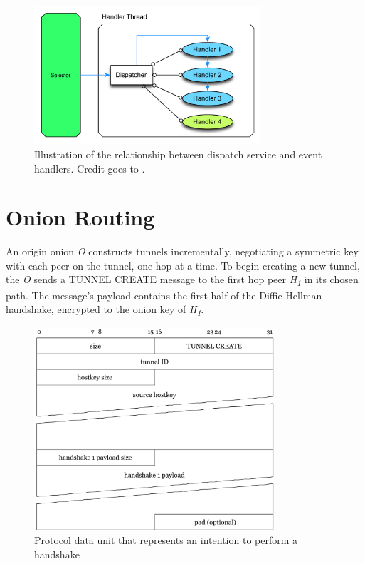 \documentclass{article}
\begin{document}
\begin{figure}[H]
\centering
     \includegraphics[width=0.75\textwidth]{arc_img2.png}
      \caption{Illustration of the relationship between dispatch service and event handlers. Credit goes to \cite{netty}.}
\end{figure}


\section{Onion Routing}

An origin onion \textit{O} constructs tunnels incrementally, negotiating a symmetric key with each peer on the tunnel, one hop at a time. To begin creating a new tunnel, the \textit{O} sends a TUNNEL CREATE message to the first hop peer \textit{H\textsubscript{1}} in its chosen path. The message's payload contains the first half of the Diffie-Hellman handshake, encrypted to the onion key of \textit{H\textsubscript{1}}.
\begin{figure}[H]
\centering
     \includegraphics[width=0.8\textwidth]{msg_tunnel_create.pdf}
      \caption{Protocol data unit that represents an intention to perform a handshake}
\end{figure}
\end{document}
